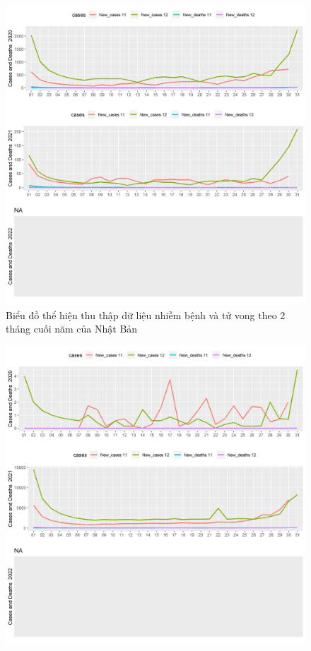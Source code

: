 \documentclass[a4paper]{article}
\theoremstyle{definition}
\begin{document}
\begin{enumerate}[i)]
\begin{enumerate}[1)]
\begin{figure}[htp]
		    \includegraphics[scale = 0.7]{Images/VI/vi6 Japan .jpeg}
		    \caption{Biểu đồ thể hiện thu thập dữ liệu nhiễm bệnh và tử vong theo 2 tháng cuối năm của Nhật Bản}
		    \label{fig:my_label}
		\end{figure}
		\begin{figure}[htp]
		    \centering
		    \includegraphics[scale = 0.7]{Images/VI/vi6 Vietnam .jpeg} 

\end{figure}
\end{enumerate}
\end{enumerate}
\end{document}
